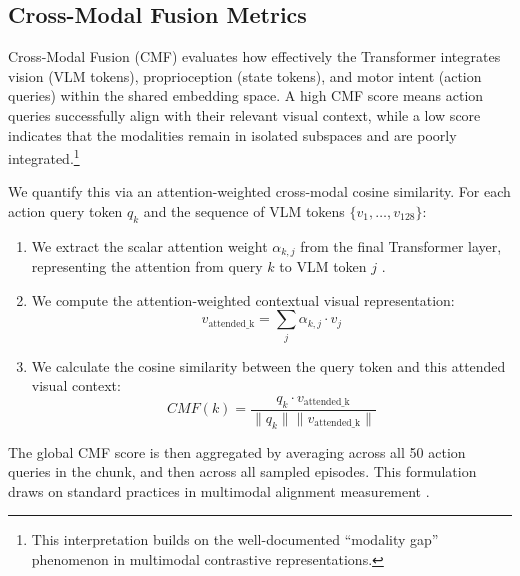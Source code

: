 \subsection{Cross-Modal Fusion Metrics}
\label{sec:cross_modal_fusion}
Cross-Modal Fusion (CMF) evaluates how effectively the Transformer integrates vision (VLM tokens), proprioception (state tokens), and motor intent (action queries) within the shared embedding space. A high CMF score means action queries successfully align with their relevant visual context, while a low score indicates that the modalities remain in isolated subspaces and are poorly integrated.\footnote{This interpretation builds on the well-documented ``modality gap'' phenomenon in multimodal contrastive representations.}

We quantify this via an attention-weighted cross-modal cosine similarity. For each action query token $q_k$ and the sequence of VLM tokens $\{v_1, \dots, v_{128}\}$:

\begin{enumerate}
    \item We extract the scalar attention weight $\alpha_{k,j}$ from the final Transformer layer, representing the attention from query $k$ to VLM token $j$ \citep{vaswani2017attention,nagrani2021attention}.

    \item We compute the attention-weighted contextual visual representation:
    \[
        v_{\text{attended\_k}} = \sum_{j} \alpha_{k,j} \cdot v_j
    \]

    \item We calculate the cosine similarity between the query token and this attended visual context:
    \[
        CMF(k) = \frac{q_k \cdot v_{\text{attended\_k}}}{\|q_k\| \|v_{\text{attended\_k}}\|}
    \]
\end{enumerate}

The global CMF score is then aggregated by averaging across all 50 action queries in the chunk, and then across all sampled episodes. This formulation draws on standard practices in multimodal alignment measurement \citep{radford2021learning,goel2022cyclip,liang2022modality}.